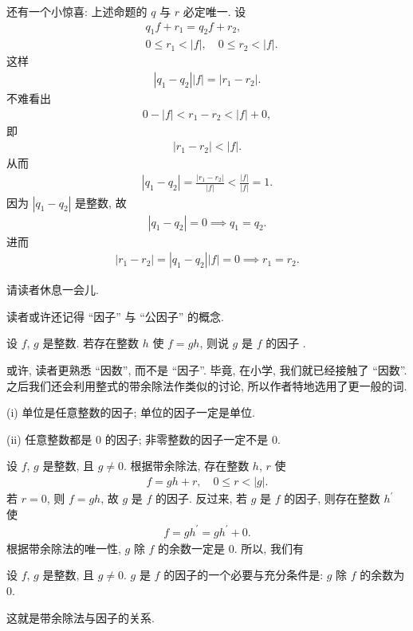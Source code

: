 还有一个小惊喜: 上述命题的 $q$ 与 $r$ 必定唯一. 设
\begin{align*}
     & q_1 f + r_1 = q_2 f + r_2,                \\
     & 0 \leq r_1 < |f|, \quad 0 \leq r_2 < |f|.
\end{align*}
这样
\begin{align*}
    |q_1 - q_2| |f| = |r_1 - r_2|.
\end{align*}
不难看出
\begin{align*}
    0 - |f| < r_1 - r_2 < |f| + 0,
\end{align*}
即
\begin{align*}
    |r_1 - r_2| < |f|.
\end{align*}
从而
\begin{align*}
    |q_1 - q_2| = \frac{|r_1 - r_2|}{|f|} < \frac{|f|}{|f|} = 1.
\end{align*}
因为 $|q_1 - q_2|$ 是整数, 故
\begin{align*}
    |q_1 - q_2| = 0 \implies q_1 = q_2.
\end{align*}
进而
\begin{align*}
    |r_1 - r_2| = |q_1 - q_2| |f| = 0 \implies r_1 = r_2.
\end{align*}

请读者休息一会儿.

\myLine

读者或许还记得 ``因子'' 与 ``公因子'' 的概念.
\begin{definition}
    设 $f$, $g$ 是整数. 若存在整数 $h$ 使 $f=gh$, 则说 $g$ 是 $f$ 的因子 .
\end{definition}

\begin{remark}
    或许, 读者更熟悉 ``因数'', 而不是 ``因子''. 毕竟, 在小学, 我们就已经接触了 ``因数''. 之后我们还会利用整式的带余除法作类似的讨论, 所以作者特地选用了更一般的词.
\end{remark}

\begin{example}
    (i) 单位是任意整数的因子; 单位的因子一定是单位.

    (ii) 任意整数都是 $0$ 的因子; 非零整数的因子一定不是 $0$.
\end{example}

设 $f$, $g$ 是整数, 且 $g \neq 0$. 根据带余除法, 存在整数 $h$, $r$ 使
\begin{align*}
    f = gh + r, \quad 0 \leq r < |g|.
\end{align*}
若 $r = 0$, 则 $f = gh$, 故 $g$ 是 $f$ 的因子. 反过来, 若 $g$ 是 $f$ 的因子, 则存在整数 $h^{\prime}$ 使
\begin{align*}
    f = gh^{\prime} = gh^{\prime} + 0.
\end{align*}
根据带余除法的唯一性, $g$ 除 $f$ 的余数一定是 $0$. 所以, 我们有
\begin{proposition}
    设 $f$, $g$ 是整数, 且 $g \neq 0$. $g$ 是 $f$ 的因子的一个必要与充分条件是: $g$ 除 $f$ 的余数为 $0$.
\end{proposition}
这就是带余除法与因子的关系.

